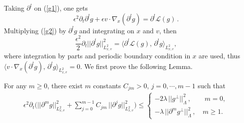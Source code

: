 \documentclass[final,onefignum,onetabnum]{siamart171218}
\begin{document}
Taking $\partial^l$ on (\ref{g1}), one gets
\begin{equation}\label{g2}\epsilon^2 \partial_t \partial^{l}g + \epsilon v\cdot\nabla_x (\partial^{l}g) = \partial^{l}\mathcal L(g)\,.\end{equation}
Multiplying (\ref{g2}) by $\partial^l g$ and integrating on $x$ and $v$, then
\begin{equation}\label{g3}\frac{\epsilon^2}{2} \partial_t ||\partial^l g||_{L^2_{x,v}}^2 = \langle \partial^{l}\mathcal L(g), \, \partial^{l}g\rangle_{L^2_{x,v}}, 
\end{equation}
where integration by parts and periodic boundary condition in $x$ are used, thus $\langle v\cdot\nabla_x(\partial^{l}g), \, \partial^l g\rangle_{L^2_{x,v}}=0$. 
We first prove the following Lemma. 
\begin{lemma}
\label{LL1}
For any $m\geq 0$, there exist $m$ constants $C_{jm}>0$, $j=0, \cdots, m-1$ such that 
\begin{align}
\label{MI}\displaystyle \epsilon^2 \partial_t \bigg(||\partial^m g||_{L^2_{x,v}}^2 + \sum_{j=0}^{m-1}C_{jm}\, ||\partial^j g||_{L^2_{x,v}}^2\bigg) \leq 
\begin{cases}   
  -2\lambda\, ||g^{\perp}||_{\Lambda}^2\,,\qquad m=0, \\[4pt]
  - \lambda\, ||\partial^m g^{\perp}||_{\Lambda}^2 \,,\quad m\geq 1. 
\end{cases}
 \end{align}
 \end{lemma}
\end{document}
